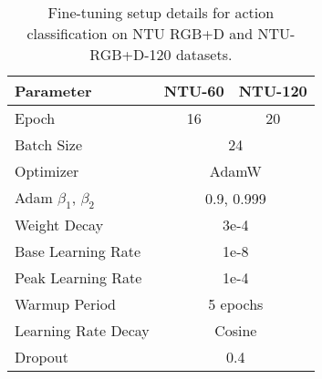 \begin{table}[h]
    \centering
    \caption{Fine-tuning setup details for action classification on NTU RGB+D \cite{ntu60Paper} and  NTU-RGB+D-120 \cite{ntu120paper} datasets.}
    \begin{tabular}{l c c}
        \toprule
        \toprule
        \textbf{Parameter}            & \textbf{NTU-60} & \textbf{NTU-120}  \\ \hline
        Epoch                         & 16              & 20                 \\ 
        Batch Size                    & \multicolumn{2}{c}{24}              \\ 
        Optimizer                     & \multicolumn{2}{c}{AdamW}           \\ 
        Adam \(\beta_1\), \(\beta_2\) & \multicolumn{2}{c}{0.9, 0.999}      \\ 
        Weight Decay                  & \multicolumn{2}{c}{3e-4}            \\ 
        Base Learning Rate            & \multicolumn{2}{c}{1e-8}            \\ 
        Peak Learning Rate            & \multicolumn{2}{c}{1e-4}            \\ 
        Warmup Period                 & \multicolumn{2}{c}{5 epochs}        \\ 
        Learning Rate Decay           & \multicolumn{2}{c}{Cosine}          \\ 
        Dropout                       & \multicolumn{2}{c}{0.4}             \\ \bottomrule
    \end{tabular}
    \label{tab:training_setup_ntu}
\end{table}